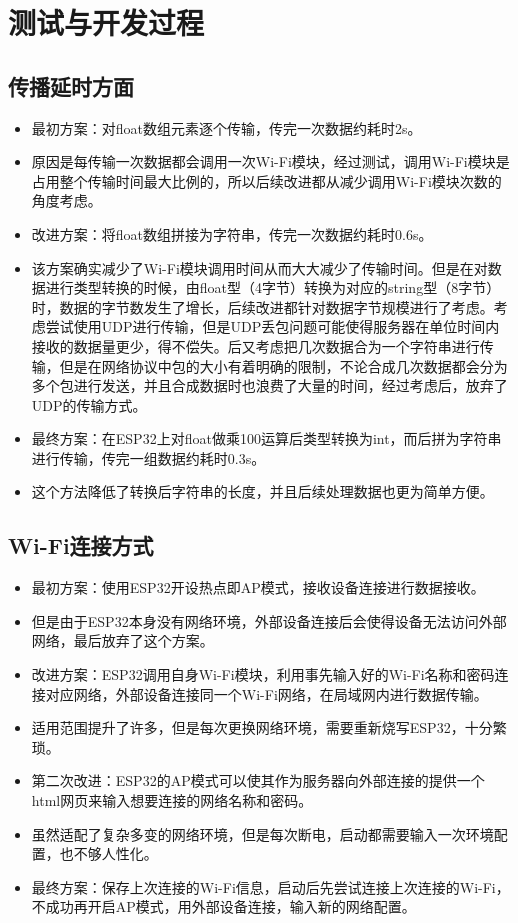 \chapter{测试与开发过程}
\section{传播延时方面}
\begin{itemize}
    \item 最初方案：对float数组元素逐个传输，传完一次数据约耗时2s。
    \item 原因是每传输一次数据都会调用一次Wi-Fi模块，经过测试，调用Wi-Fi模块是占用整个传输时间最大比例的，所以后续改进都从减少调用Wi-Fi模块次数的角度考虑。
    \item 改进方案：将float数组拼接为字符串，传完一次数据约耗时0.6s。
    \item 该方案确实减少了Wi-Fi模块调用时间从而大大减少了传输时间。但是在对数据进行类型转换的时候，由float型（4字节）转换为对应的string型（8字节）时，数据的字节数发生了增长，后续改进都针对数据字节规模进行了考虑。考虑尝试使用UDP进行传输，但是UDP丢包问题可能使得服务器在单位时间内接收的数据量更少，得不偿失。后又考虑把几次数据合为一个字符串进行传输，但是在网络协议中包的大小有着明确的限制，不论合成几次数据都会分为多个包进行发送，并且合成数据时也浪费了大量的时间，经过考虑后，放弃了UDP的传输方式。
    \item 最终方案：在ESP32上对float做乘100运算后类型转换为int，而后拼为字符串进行传输，传完一组数据约耗时0.3s。
    \item 这个方法降低了转换后字符串的长度，并且后续处理数据也更为简单方便。
    \end{itemize}
\section{Wi-Fi连接方式}
\begin{itemize}
    \item 最初方案：使用ESP32开设热点即AP模式，接收设备连接进行数据接收。
    \item 但是由于ESP32本身没有网络环境，外部设备连接后会使得设备无法访问外部网络，最后放弃了这个方案。
    \item 改进方案：ESP32调用自身Wi-Fi模块，利用事先输入好的Wi-Fi名称和密码连接对应网络，外部设备连接同一个Wi-Fi网络，在局域网内进行数据传输。
    \item 适用范围提升了许多，但是每次更换网络环境，需要重新烧写ESP32，十分繁琐。
    \item 第二次改进：ESP32的AP模式可以使其作为服务器向外部连接的提供一个html网页来输入想要连接的网络名称和密码。
    \item 虽然适配了复杂多变的网络环境，但是每次断电，启动都需要输入一次环境配置，也不够人性化。
    \item 最终方案：保存上次连接的Wi-Fi信息，启动后先尝试连接上次连接的Wi-Fi，不成功再开启AP模式，用外部设备连接，输入新的网络配置。
    \end{itemize}
